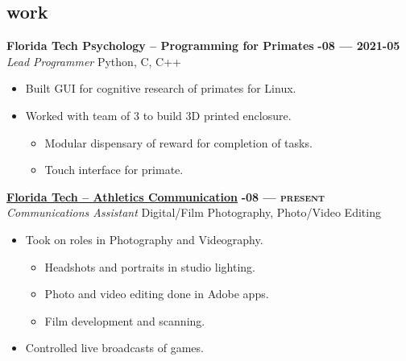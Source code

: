 \documentclass[margin,10pt]{res}
\begin{document}
\begin{resume}
    \section{\sc \lsstyle work}
        \textbf{Florida Tech Psychology -- Programming for Primates}
        \hfill
        \textsc{\bfseries{}-08 --- 2021-05}
        \\
        \textit{Lead Programmer}
        \hfill
        Python, C, C++
        \vspace{0.5em}
        \begin{itemize}
            \item Built GUI for cognitive research of primates for Linux.
            \item Worked with team of 3 to build 3D printed enclosure.
            \begin{itemize}
                \item Modular dispensary of reward for completion of tasks.
                \item Touch interface for primate.
            \end{itemize}
        \end{itemize}

        \href{https://floridatechsports.com/}{\textbf{Florida Tech -- Athletics Communication}}
        \hfill
        \textsc{\bfseries{}-08 --- present}
        \\
        \textit{Communications Assistant}
        \hfill
        Digital/Film Photography, Photo/Video Editing
        \vspace{0.5em}
        \begin{itemize}
            \item Took on roles in Photography and Videography.
            \begin{itemize}
                \item Headshots and portraits in studio lighting.
                \item Photo and video editing done in Adobe apps.
                \item Film development and scanning.
            \end{itemize}
            \item Controlled live broadcasts of games.
        \end{itemize}


\end{resume}
\end{document}
